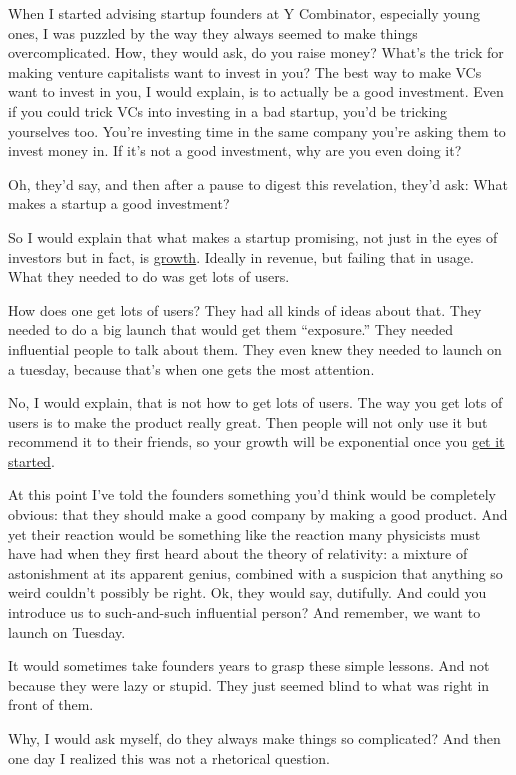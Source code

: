 When I started advising startup founders at Y Combinator, especially
young ones, I was puzzled by the way they always seemed to make things
overcomplicated. How, they would ask, do you raise money? What's the
trick for making venture capitalists want to invest in you? The best way
to make VCs want to invest in you, I would explain, is to actually be a
good investment. Even if you could trick VCs into investing in a bad
startup, you'd be tricking yourselves too. You're investing time in the
same company you're asking them to invest money in. If it's not a good
investment, why are you even doing it?

Oh, they'd say, and then after a pause to digest this revelation, they'd
ask: What makes a startup a good investment?

So I would explain that what makes a startup promising, not just in the
eyes of investors but in fact, is \href{growth.html}{growth}. Ideally in
revenue, but failing that in usage. What they needed to do was get lots
of users.

How does one get lots of users? They had all kinds of ideas about that.
They needed to do a big launch that would get them ``exposure.'' They
needed influential people to talk about them. They even knew they needed
to launch on a tuesday, because that's when one gets the most attention.

No, I would explain, that is not how to get lots of users. The way you
get lots of users is to make the product really great. Then people will
not only use it but recommend it to their friends, so your growth will
be exponential once you \href{ds.html}{get it started}.

At this point I've told the founders something you'd think would be
completely obvious: that they should make a good company by making a
good product. And yet their reaction would be something like the
reaction many physicists must have had when they first heard about the
theory of relativity: a mixture of astonishment at its apparent genius,
combined with a suspicion that anything so weird couldn't possibly be
right. Ok, they would say, dutifully. And could you introduce us to
such-and-such influential person? And remember, we want to launch on
Tuesday.

It would sometimes take founders years to grasp these simple lessons.
And not because they were lazy or stupid. They just seemed blind to what
was right in front of them.

Why, I would ask myself, do they always make things so complicated? And
then one day I realized this was not a rhetorical question.

